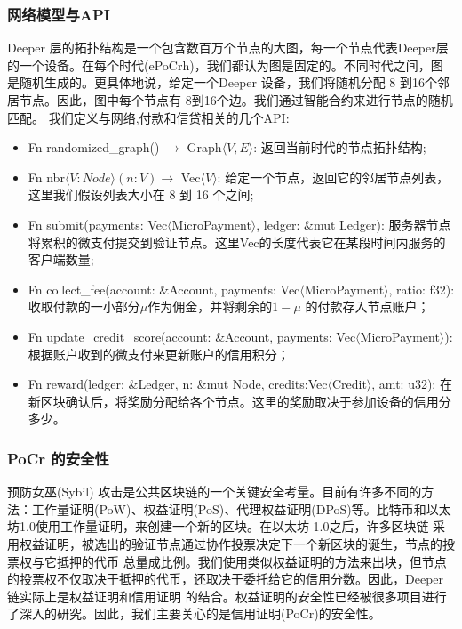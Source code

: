 \documentclass[a4paper]{article}
\begin{document}
\subsubsection{网络模型与API}
Deeper 层的拓扑结构是一个包含数百万个节点的大图，每一个节点代表Deeper层的一个设备。在每个时代(ePoCrh)，我们都认为图是固定的。不同时代之间，图是随机生成的。更具体地说，给定一个Deeper 设备，我们将随机分配 8 到16个邻居节点。因此，图中每个节点有 8到16个边。我们通过智能合约来进行节点的随机匹配。 我们定义与网络,付款和信贷相关的几个API:

\begin{itemize}
    \item Fn randomized\_graph() $\rightarrow$ Graph$\langle V,E \rangle$: 返回当前时代的节点拓扑结构;
    \item Fn nbr$\langle V:Node \rangle (n: V) \rightarrow$ Vec$\langle V \rangle$: 给定一个节点，返回它的邻居节点列表，这里我们假设列表大小在 8 到 16 个之间;
    \item Fn submit(payments: Vec$\langle$MicroPayment$\rangle$, ledger: \&mut Ledger): 服务器节点将累积的微支付提交到验证节点。这里Vec的长度代表它在某段时间内服务的客户端数量;
    \item Fn collect\_fee(account: \&Account, payments: Vec$\langle$MicroPayment$\rangle$, ratio: f32): 收取付款的一小部分$\mu$作为佣金，并将剩余的$1-\mu$ 的付款存入节点账户；
    \item Fn update\_credit\_score(account: \&Account, payments: Vec$\langle$MicroPayment$\rangle$): 根据账户收到的微支付来更新账户的信用积分；
    \item Fn reward(ledger: \&Ledger, n: \&mut Node,  credits:Vec$\langle$Credit$\rangle$, amt: u32): 在新区块确认后，将奖励分配给各个节点。这里的奖励取决于参加设备的信用分多少。
\end{itemize}

\subsubsection{PoCr 的安全性}
预防女巫(Sybil) 攻击是公共区块链的一个关键安全考量。目前有许多不同的方法：工作量证明(PoW)、权益证明(PoS)、代理权益证明(DPoS)等。比特币和以太坊1.0使用工作量证明，来创建一个新的区块。在以太坊 1.0之后，许多区块链
采用权益证明，被选出的验证节点通过协作投票决定下一个新区块的诞生，节点的投票权与它抵押的代币
总量成比例。我们使用类似权益证明的方法来出块，但节点的投票权不仅取决于抵押的代币，还取决于委托给它的信用分数。因此，Deeper链实际上是权益证明和信用证明
的结合。权益证明的安全性已经被很多项目进行了深入的研究。因此，我们主要关心的是信用证明(PoCr)的安全性。
\end{document}
